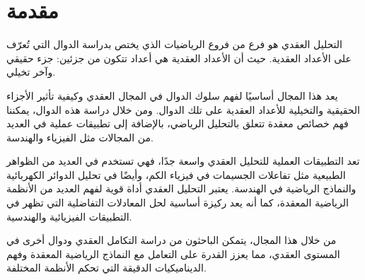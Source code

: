 \chapter*{مقدمة}
	التحليل العقدي هو فرع من فروع الرياضيات الذي يختص بدراسة الدوال التي تُعرّف على الأعداد العقدية. حيث أن الأعداد العقدية هي أعداد تتكون من جزئين: جزء حقيقي وآخر تخيلي. 
	
	يعد هذا المجال أساسيًا لفهم سلوك الدوال في المجال العقدي وكيفية تأثير الأجزاء الحقيقية والتخيلية للأعداد العقدية على تلك الدوال. ومن خلال دراسة هذه الدوال، يمكننا فهم خصائص معقدة تتعلق بالتحليل الرياضي، بالإضافة إلى تطبيقات عملية في العديد من المجالات مثل الفيزياء والهندسة.
	
	تعد التطبيقات العملية للتحليل العقدي واسعة جدًا، فهي تستخدم في العديد من الظواهر الطبيعية مثل تفاعلات الجسيمات في فيزياء الكم، وأيضًا في تحليل الدوائر الكهربائية والنماذج الرياضية في الهندسة. يعتبر التحليل العقدي أداة قوية لفهم العديد من الأنظمة الرياضية المعقدة، كما أنه يعد ركيزة أساسية لحل المعادلات التفاضلية التي تظهر في التطبيقات الفيزيائية والهندسية.
	
	من خلال هذا المجال، يتمكن الباحثون من دراسة التكامل العقدي ودوال أخرى في المستوى العقدي، مما يعزز القدرة على التعامل مع النماذج الرياضية المعقدة وفهم الديناميكيات الدقيقة التي تحكم الأنظمة المختلفة.
	
